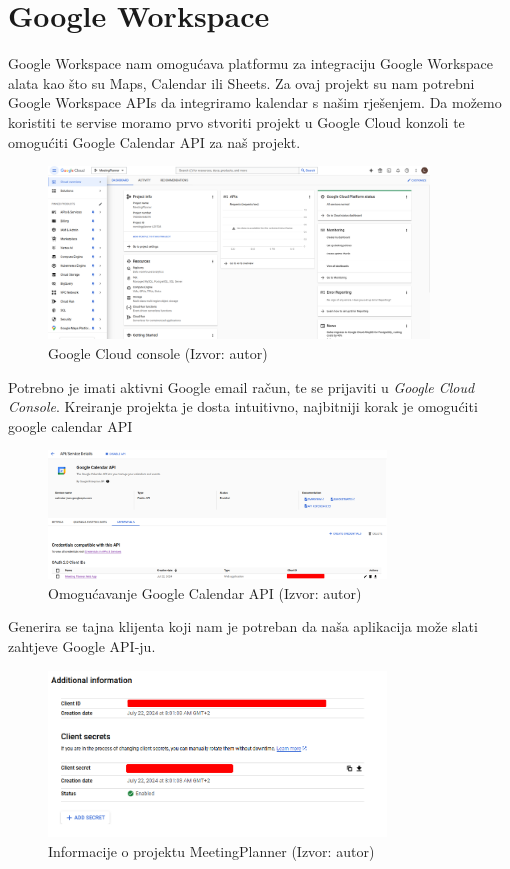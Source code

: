 \documentclass{foi}
\begin{document}
\section{Google Workspace}
Google Workspace nam omogućava platformu za integraciju Google Workspace alata kao što su Maps, Calendar ili Sheets. Za ovaj projekt su nam potrebni Google Workspace APIs da integriramo kalendar s našim rješenjem.
Da možemo koristiti te servise moramo prvo stvoriti projekt u Google Cloud konzoli te omogućiti Google Calendar API za naš projekt.
\begin{figure}[H]
    \centering
    \includegraphics[width=0.9\textwidth]{slike/google_console.png}
    \caption{Google Cloud console (Izvor: autor)}
    \label{fig:google_console}
\end{figure}
Potrebno je imati aktivni Google email račun, te se prijaviti u \textit{Google Cloud Console}. Kreiranje projekta je dosta intuitivno, najbitniji korak je omogućiti google calendar API
\begin{figure}[H]
    \centering
    \includegraphics[width=0.8\textwidth]{slike/enabledGoogleCalendarAPI.png}
    \caption{Omogućavanje Google Calendar API (Izvor: autor)}
    \label{fig:enabledGoogleCalendarAPI}
\end{figure}

Generira se tajna klijenta koji nam je potreban da naša aplikacija može slati zahtjeve Google API-ju.
\begin{figure}[H]
    \centering
    \includegraphics[width=0.8\textwidth]{slike/additionalINfo.png}
    \caption{Informacije o projektu MeetingPlanner (Izvor: autor)}
    \label{fig:additionalINfo}
\end{figure}
\end{document}
